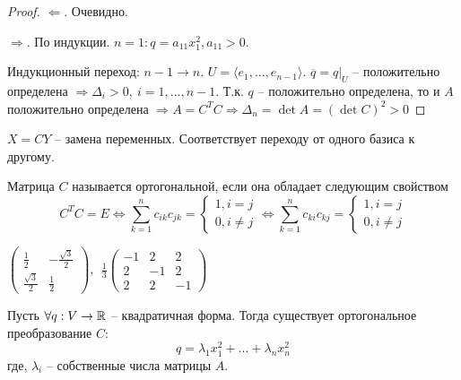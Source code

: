 \begin{proof}
	$\Leftarrow.$ Очевидно.

	$\Rightarrow$. По индукции. $n=1: q = a_{11}x^2_1, a_{11} > 0$.

	Индукционный переход: $n-1 \to n$. $U = \langle e_1, ..., e_{n-1}\rangle$. $\overline{q} = q \big|_U$ -- положительно определена $\Rightarrow \Delta_i > 0, \ i = 1, ..., n-1$.
	Т.к. $q$ -- положительно определена, то и $A$ положительно определена $\Rightarrow A = C^TC \Rightarrow \Delta_n = \det A = (\det C)^2 > 0$ 
\end{proof}

\begin{Def} 
	$X = CY$ -- замена переменных. Соответствует переходу от одного базиса к другому. 
\end{Def} 

\begin{Def} 
	Матрица $C$ называется ортогональной, если она обладает следующим свойством $$C^TC=E \Leftrightarrow \sum_{k=1}^{n} c_{ik} c_{jk} = \begin{cases}
		1, i = j\\
		0, i \neq j
	\end{cases} \Leftrightarrow \sum_{k=1}^{n} c_{ki}c_{kj} = \begin{cases}
		1, i = j\\
		0, i \neq j
	\end{cases}$$
\end{Def} 

\begin{Example}
	$\left(\begin{array}{cc}
		\frac{1}{2} & -\frac{\sqrt{3}}{2}\\
		\frac{\sqrt{3}}{2} & \frac{1}{2}
	\end{array} \right), \ \
	\frac{1}{3} \left(
	\begin{array}{ccc}
		-1 & 2 & 2\\
		2 & -1 & 2\\ 
		2 & 2 & -1
	\end{array} \right)$
\end{Example}

\begin{Thm} 
	Пусть $\forall q: V \to \mathbb{R}$ -- квадратичная форма. Тогда существует ортогональное преобразование $C:$
	$$q = \lambda_1 x_1^2 + ... + \lambda_n x_n^2$$ 
	где, $\lambda_i$ -- собственные числа матрицы $A$.
\end{Thm} 



